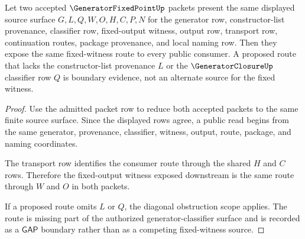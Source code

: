 \begin{theorem}
\label{thm:generator-fixed-point-fixed-witness-source-determinacy}
Let two accepted $\GeneratorFixedPointUp$ packets present the same displayed source surface $G,L,Q,W,O,H,C,P,N$ for the generator row, constructor-list provenance, classifier row, fixed-output witness, output row, transport row, continuation routes, package provenance, and local naming row. Then they expose the same fixed-witness route to every public consumer. A proposed route that lacks the constructor-list provenance $L$ or the $\GeneratorClosureUp$ classifier row $Q$ is boundary evidence, not an alternate source for the fixed witness.
\end{theorem}
\begin{proof}
Use the admitted packet row to reduce both accepted packets to the same finite source surface. Since the displayed rows agree, a public read begins from the same generator, provenance, classifier, witness, output, route, package, and naming coordinates.

The transport row identifies the consumer route through the shared $H$ and $C$ rows. Therefore the fixed-output witness exposed downstream is the same route through $W$ and $O$ in both packets.

If a proposed route omits $L$ or $Q$, the diagonal obstruction scope applies. The route is missing part of the authorized generator-classifier surface and is recorded as a $\mathsf{GAP}$ boundary rather than as a competing fixed-witness source.
\end{proof}

